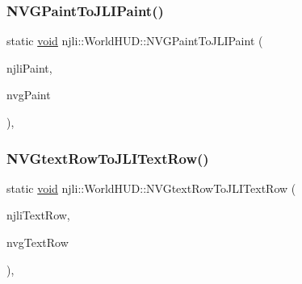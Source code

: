 \mbox{\label{classnjli_1_1_world_h_u_d_a85633ec6492ef69686611f75c7453659}} 
\subsubsection{\texorpdfstring{N\+V\+G\+Paint\+To\+J\+L\+I\+Paint()}{NVGPaintToJLIPaint()}}
{\footnotesize\ttfamily static \mbox{\hyperlink{_thread_8h_af1e856da2e658414cb2456cb6f7ebc66}{void}} njli\+::\+World\+H\+U\+D\+::\+N\+V\+G\+Paint\+To\+J\+L\+I\+Paint (\begin{DoxyParamCaption}\item[{\mbox{\hyperlink{structnjli_1_1_j_l_i_paint}{J\+L\+I\+Paint}} \&}]{njli\+Paint,  }\item[{const N\+V\+Gpaint \&}]{nvg\+Paint }\end{DoxyParamCaption})\hspace{0.3cm}{\ttfamily [static]}, {\ttfamily [protected]}}

\mbox{\label{classnjli_1_1_world_h_u_d_a4ab78ad7055377d623e1cd28a4aca545}} 
\subsubsection{\texorpdfstring{N\+V\+Gtext\+Row\+To\+J\+L\+I\+Text\+Row()}{NVGtextRowToJLITextRow()}}
{\footnotesize\ttfamily static \mbox{\hyperlink{_thread_8h_af1e856da2e658414cb2456cb6f7ebc66}{void}} njli\+::\+World\+H\+U\+D\+::\+N\+V\+Gtext\+Row\+To\+J\+L\+I\+Text\+Row (\begin{DoxyParamCaption}\item[{\mbox{\hyperlink{structnjli_1_1_j_l_i_text_row}{J\+L\+I\+Text\+Row}} \&}]{njli\+Text\+Row,  }\item[{const N\+V\+Gtext\+Row \&}]{nvg\+Text\+Row }\end{DoxyParamCaption})\hspace{0.3cm}{\ttfamily [static]}, {\ttfamily [protected]}}

